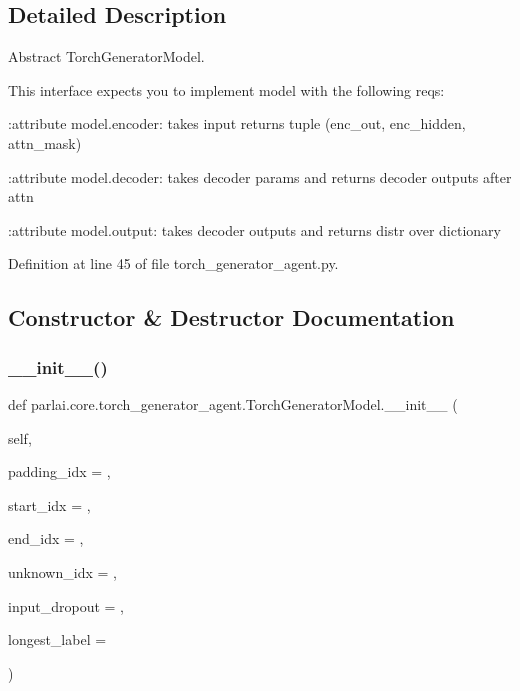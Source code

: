 \subsection{Detailed Description}
\begin{DoxyVerb}Abstract TorchGeneratorModel.

This interface expects you to implement model with the following reqs:

:attribute model.encoder:
    takes input returns tuple (enc_out, enc_hidden, attn_mask)

:attribute model.decoder:
    takes decoder params and returns decoder outputs after attn

:attribute model.output:
    takes decoder outputs and returns distr over dictionary
\end{DoxyVerb}
 

Definition at line 45 of file torch\+\_\+generator\+\_\+agent.\+py.



\subsection{Constructor \& Destructor Documentation}
\mbox{\label{classparlai_1_1core_1_1torch__generator__agent_1_1TorchGeneratorModel_aaec943d5add4e6d90fdd451f740be6af}} 
\subsubsection{\texorpdfstring{\+\_\+\+\_\+init\+\_\+\+\_\+()}{\_\_init\_\_()}}
{\footnotesize\ttfamily def parlai.\+core.\+torch\+\_\+generator\+\_\+agent.\+Torch\+Generator\+Model.\+\_\+\+\_\+init\+\_\+\+\_\+ (\begin{DoxyParamCaption}\item[{}]{self,  }\item[{}]{padding\+\_\+idx = {},  }\item[{}]{start\+\_\+idx = {},  }\item[{}]{end\+\_\+idx = {},  }\item[{}]{unknown\+\_\+idx = {},  }\item[{}]{input\+\_\+dropout = {},  }\item[{}]{longest\+\_\+label = {} }\end{DoxyParamCaption})}



